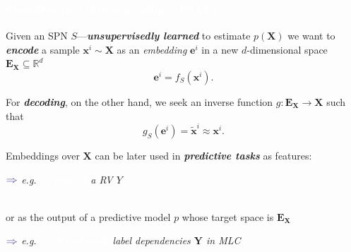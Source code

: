 \documentclass[xcolor={usenames,dvipsnames,svgnames}, compress]{beamer}
\newcommand{\highlighttext}[2][yellow]{{\colorbox{#1}{\textcolor{white}{#2}}}}
\begin{document}
\begin{frame}[t]
  \frametitle{\highlighttext[bgrey0]{Sum-Product Autoencoding (SPAE)}}
  \footnotesize


  Given an SPN $S$---\emph{\textbf{unsupervisedly learned}} to
  estimate $p(\mathbf{X})$ we want to {\textbf{\emph{encode}}} a sample
  $\mathbf{x}^{i}\sim\mathbf{X}$ as an \emph{embedding} $\mathbf{e}^{i}$ in a new $d$-dimensional
space $\mathbf{E}_{\mathbf{X}}\subseteq\mathbb{R}^{d}$
    $$\mathbf{e}^{i} = f_{S}(\mathbf{x}^{i}).$$

 For \textbf{\emph{decoding}}, on the other hand, we seek an inverse function
$g\colon\mathbf{E}_{\mathbf{X}}\rightarrow\mathbf{X}$ such that
$$ g_{S}(\mathbf{e}^{i}) =
{\tilde{\mathbf{x}}}^{i}\approx{{\mathbf{x}}}^{i}.$$

Embeddings over $\mathbf{X}$ can be later used in {\textbf{\emph{predictive
  tasks}}} as features:
\begin{minipage}{1.0\linewidth}
      \raggedleft
      $\color{violet}\boldsymbol\Rightarrow$
      \scriptsize
     \emph{e.g. \highlighttext[tomato0]{\emph{\textbf{to predict}}} a RV $Y$%
     }
\end{minipage}\\[5pt]
or as the output of a predictive model $p$ whose target space
is $\mathbf{E}_{\mathbf{X}}$
\begin{minipage}{1.0\linewidth}
      \raggedleft
      $\color{violet}\boldsymbol\Rightarrow$
      \scriptsize
     \emph{e.g. \highlighttext[tomato0]{\emph{\textbf{to disentangle}}} label dependencies $\mathbf{Y}$ in MLC%
     }
\end{minipage}\par\bigskip


\end{frame}
\end{document}
